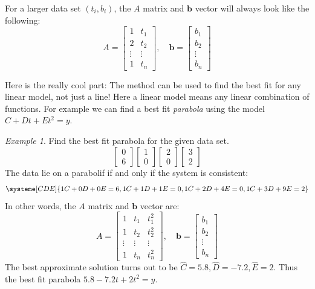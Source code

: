 \documentclass[11pt,oneside]{amsbook}
\theoremstyle{definition}
\theoremstyle{plain}
\theoremstyle{definition}
\theoremstyle{remark}
\newtheorem{example}[theorem]{Example}
\numberwithin{equation}{section}
\numberwithin{figure}{section}
\begin{document}
For a larger data set $(t_i,b_i)$, the $A$ matrix and $\mathbf{b}$ vector will always look like the following:
\[A=\begin{bmatrix}
    1&t_1\\
    2&t_2\\
    \vdots&\vdots\\
    1&t_n
  \end{bmatrix}
  ,\quad
  \mathbf{b}=\begin{bmatrix}b_1\\b_2\\\vdots\\b_n\end{bmatrix}
\]

Here is the really cool part: The method can be used to find the best fit for any linear model, not just a line! Here a linear model means any linear combination of functions. For example we can find a best fit \emph{parabola} using the model $C+Dt+Et^2=y$.

\begin{example}
  Find the best fit parabola for the given data set.
  \[\begin{bmatrix}0\\6\end{bmatrix}
    \begin{bmatrix}1\\0\end{bmatrix}
    \begin{bmatrix}2\\0\end{bmatrix}
    \begin{bmatrix}3\\2\end{bmatrix}
  \]
  The data lie on a parabolif if and only if the system is consistent:
  \[\systeme[CDE]{1C+0D+0E=6,1C+1D+1E=0,1C+2D+4E=0,1C+3D+9E=2}
  \]
  In other words, the $A$ matrix and $\mathbf{b}$ vector are:
  \[A=\begin{bmatrix}
      1&t_1&t_1^2\\
      1&t_2&t_2^2\\
      \vdots&\vdots&\vdots\\
      1&t_n&t_n^2
    \end{bmatrix}
    ,\quad
    \mathbf{b}=\begin{bmatrix}
      b_1\\b_2\\\vdots\\b_n
    \end{bmatrix}
  \]
  The best approximate solution turns out to be $\hat C=5.8,\hat D=-7.2,\hat E=2$. Thus the best fit parabola $5.8-7.2t+2t^2=y$.
\end{example}
\end{document}
